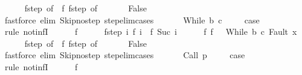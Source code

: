 \begin{isabellebody}
\ \ \ \ \isamarkupfalse%
\ f{\isacharunderscore}step\ {\isacharbrackleft}of\ {}{\isacharbrackright}\ f{\isacharunderscore}{}\ f{\isacharunderscore}step\ {\isacharbrackleft}of\ {}{\isacharbrackright}\isanewline
\ \ \ \ \isamarkupfalse%
\ False\isanewline
\ \ \ \ \ \ \isamarkupfalse%
\ {\isacharparenleft}fastforce\ elim{\isacharcolon}\ Skip{\isacharunderscore}no{\isacharunderscore}step\ step{\isacharunderscore}elim{\isacharunderscore}cases{\isacharparenright}\isanewline
\ \ \isamarkupfalse%
\isanewline
{}\isamarkupfalse%
\isanewline
\ \ \isamarkupfalse%
\ {\isacharparenleft}While\ b\ c{\isacharparenright}\ \isanewline
\ \ \isamarkupfalse%
\ {\isacharquery}case\ \isanewline
\ \ \isamarkupfalse%
\ {\isacharparenleft}rule\ not{\isacharunderscore}infI{\isacharparenright}\isanewline
\ \ \ \ \isamarkupfalse%
\ f\isanewline
\ \ \ \ \isamarkupfalse%
\ f{\isacharunderscore}step{\isacharcolon}\ {\isachardoublequoteopen}{\isasymAnd}i{\isachardot}\ {\isasymGamma}{\isasymturnstile}f\ i\ {\isasymrightarrow}\ f\ {\isacharparenleft}Suc\ i{\isacharparenright}{\isachardoublequoteclose}\isanewline
\ \ \ \ \isamarkupfalse%
\ f{\isacharunderscore}{}{\isacharcolon}\ {\isachardoublequoteopen}f\ {}\ {\isacharequal}\ {\isacharparenleft}While\ b\ c{\isacharcomma}\ Fault\ x{\isacharparenright}{\isachardoublequoteclose}\ \isanewline
\ \ \ \ \isamarkupfalse%
\ f{\isacharunderscore}step\ {\isacharbrackleft}of\ {}{\isacharbrackright}\ f{\isacharunderscore}{}\ f{\isacharunderscore}step\ {\isacharbrackleft}of\ {}{\isacharbrackright}\isanewline
\ \ \ \ \isamarkupfalse%
\ False\isanewline
\ \ \ \ \ \ \isamarkupfalse%
\ {\isacharparenleft}fastforce\ elim{\isacharcolon}\ Skip{\isacharunderscore}no{\isacharunderscore}step\ step{\isacharunderscore}elim{\isacharunderscore}cases{\isacharparenright}\isanewline
\ \ \isamarkupfalse%
\isanewline
{}\isamarkupfalse%
\isanewline
\ \ \isamarkupfalse%
\ {\isacharparenleft}Call\ p{\isacharparenright}\ \isanewline
\ \ \isamarkupfalse%
\ {\isacharquery}case\ \isanewline
\ \ \isamarkupfalse%
\ {\isacharparenleft}rule\ not{\isacharunderscore}infI{\isacharparenright}\isanewline
\ \ \ \ \isamarkupfalse%
\ f\isanewline
\ \ \ \ \isamarkupfalse%

\end{isabellebody}
